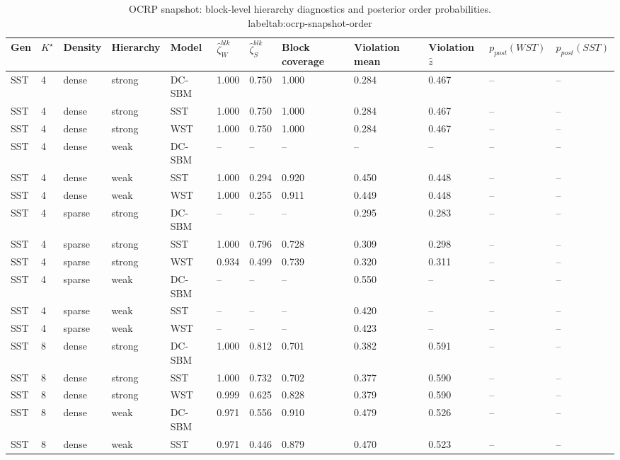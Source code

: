 \begin{table}[!h]
\centering
\caption{OCRP snapshot: block-level hierarchy diagnostics and posterior order probabilities.\\label{tab:ocrp-snapshot-order}}
\centering
\begin{tabular}[t]{llllllllllll}
\toprule
Gen & $K^\star$ & Density & Hierarchy & Model & $\widehat\zeta_W^{blk}$ & $\widehat\zeta_S^{blk}$ & Block coverage & Violation mean & Violation $\hat z$ & $p_{post}(WST)$ & $p_{post}(SST)$\\
\midrule
SST & 4 & dense & strong & DC-SBM & 1.000 & 0.750 & 1.000 & 0.284 & 0.467 & -- & --\\
SST & 4 & dense & strong & SST & 1.000 & 0.750 & 1.000 & 0.284 & 0.467 & -- & --\\
SST & 4 & dense & strong & WST & 1.000 & 0.750 & 1.000 & 0.284 & 0.467 & -- & --\\
SST & 4 & dense & weak & DC-SBM & -- & -- & -- & -- & -- & -- & --\\
SST & 4 & dense & weak & SST & 1.000 & 0.294 & 0.920 & 0.450 & 0.448 & -- & --\\
SST & 4 & dense & weak & WST & 1.000 & 0.255 & 0.911 & 0.449 & 0.448 & -- & --\\
SST & 4 & sparse & strong & DC-SBM & -- & -- & -- & 0.295 & 0.283 & -- & --\\
SST & 4 & sparse & strong & SST & 1.000 & 0.796 & 0.728 & 0.309 & 0.298 & -- & --\\
SST & 4 & sparse & strong & WST & 0.934 & 0.499 & 0.739 & 0.320 & 0.311 & -- & --\\
SST & 4 & sparse & weak & DC-SBM & -- & -- & -- & 0.550 & -- & -- & --\\
SST & 4 & sparse & weak & SST & -- & -- & -- & 0.420 & -- & -- & --\\
SST & 4 & sparse & weak & WST & -- & -- & -- & 0.423 & -- & -- & --\\
SST & 8 & dense & strong & DC-SBM & 1.000 & 0.812 & 0.701 & 0.382 & 0.591 & -- & --\\
SST & 8 & dense & strong & SST & 1.000 & 0.732 & 0.702 & 0.377 & 0.590 & -- & --\\
SST & 8 & dense & strong & WST & 0.999 & 0.625 & 0.828 & 0.379 & 0.590 & -- & --\\
SST & 8 & dense & weak & DC-SBM & 0.971 & 0.556 & 0.910 & 0.479 & 0.526 & -- & --\\
SST & 8 & dense & weak & SST & 0.971 & 0.446 & 0.879 & 0.470 & 0.523 & -- & --\\

\end{tabular}
\end{table}
